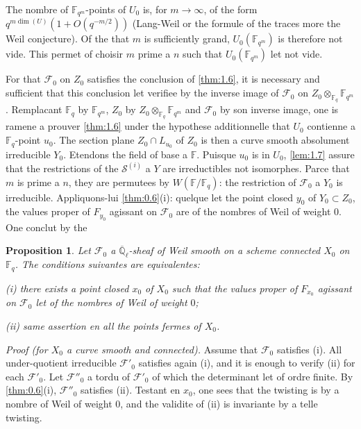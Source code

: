 \documentclass[11pt,a4paper]{article}
\theoremstyle{plain}
\newtheorem{proposition}[theorem]{Proposition}
\theoremstyle{definition}
\begin{document}
The nombre of $\mathbb{F}_{q^m}$-points of $U_0$ is, for $m \to \infty$, of the form $q^{m\dim(U)}(1+O(q^{-m/2}))$ (Lang-Weil or the formule of the traces more the Weil conjecture). Of the that $m$ is sufficiently grand, $U_0(\mathbb{F}_{q^m})$ is therefore not vide. This permet of choisir $m$ prime a $n$ such that $U_0(\mathbb{F}_{q^m})$ let not vide.

For that $\mathcal{F}_0$ on $Z_0$ satisfies the conclusion of \ref{thm:1.6}, it is necessary and sufficient that this conclusion let verifiee by the inverse image of $\mathcal{F}_0$ on $Z_0 \otimes_{\mathbb{F}_q} \mathbb{F}_{q^m}$. Remplacant $\mathbb{F}_q$ by $\mathbb{F}_{q^m}$, $Z_0$ by $Z_0 \otimes_{\mathbb{F}_q} \mathbb{F}_{q^m}$ and $\mathcal{F}_0$ by son inverse image, one is ramene a prouver \ref{thm:1.6} under the hypothese additionnelle that $U_0$ contienne a $\mathbb{F}_q$-point $u_0$. The section plane $Z_0 \cap L_{u_0}$ of $Z_0$ is then a curve smooth absolument irreducible $Y_0$. Etendons the field of base a $\mathbb{F}$. Puisque $u_0$ is in $U_0$, \ref{lem:1.7} assure that the restrictions of the $\mathcal{S}^{(i)}$ a $Y$ are irreductibles not isomorphes. Parce that $m$ is prime a $n$, they are permutees by $W(\mathbb{F}/\mathbb{F}_q)$: the restriction of $\mathcal{F}_0$ a $Y_0$ is irreducible. Appliquons-lui \ref{thm:0.6}(i): quelque let the point closed $y_0$ of $Y_0 \subset Z_0$, the values proper of $F_{y_0}$ agissant on $\mathcal{F}_0$ are of the nombres of Weil of weight $0$. One conclut by the

\begin{proposition}\label{prop:1.9}
Let $\mathcal{F}_0$ a $\overline{\mathbb{Q}}_\ell$-sheaf of Weil smooth on a scheme connected $X_0$ on $\mathbb{F}_q$. The conditions suivantes are equivalentes:

\emph{(i)} there exists a point closed $x_0$ of $X_0$ such that the values proper of $F_{x_0}$ agissant on $\mathcal{F}_0$ let of the nombres of Weil of weight $0$;

\emph{(ii)} same assertion en all the points fermes of $X_0$.
\end{proposition}

\noindent\textit{Proof (for $X_0$ a curve smooth and connected).} Assume that $\mathcal{F}_0$ satisfies (i). All under-quotient irreducible $\mathcal{F}'_0$ satisfies again (i), and it is enough to verify (ii) for each $\mathcal{F}'_0$. Let $\mathcal{F}''_0$ a tordu of $\mathcal{F}'_0$ of which the determinant let of ordre finite. By \ref{thm:0.6}(i), $\mathcal{F}''_0$ satisfies (ii). Testant en $x_0$, one sees that the twisting is by a nombre of Weil of weight $0$, and the validite of (ii) is invariante by a telle twisting.
\end{document}

